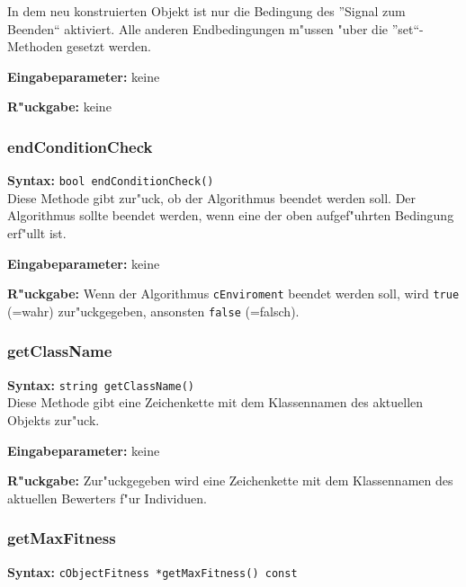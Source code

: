 In dem neu konstruierten Objekt ist nur die Bedingung des ''Signal zum Beenden`` aktiviert. Alle anderen Endbedingungen m"ussen "uber die ''set``-Methoden gesetzt werden.

\bigskip\noindent
\textbf{Eingabeparameter:} keine

\bigskip\noindent
\textbf{R"uckgabe:} keine


\subsubsection{endConditionCheck}

\textbf{Syntax:} \verb|bool endConditionCheck()| \\

Diese Methode gibt zur"uck, ob der Algorithmus beendet werden soll. Der Algorithmus sollte beendet werden, wenn eine der oben aufgef"uhrten Bedingung erf"ullt ist.

\bigskip\noindent
\textbf{Eingabeparameter:} keine

\bigskip\noindent
\textbf{R"uckgabe:} Wenn der Algorithmus \verb|cEnviroment| beendet werden soll, wird \verb|true| (=wahr) zur"uckgegeben, ansonsten \verb|false| (=falsch).


\subsubsection{getClassName}

\textbf{Syntax:} \verb|string getClassName()| \\

Diese Methode gibt eine Zeichenkette mit dem Klassennamen des aktuellen Objekts zur"uck.

\bigskip\noindent
\textbf{Eingabeparameter:} keine

\bigskip\noindent
\textbf{R"uckgabe:} Zur"uckgegeben wird eine Zeichenkette mit dem Klassennamen des aktuellen Bewerters f"ur Individuen.


\subsubsection{getMaxFitness}

\textbf{Syntax:} \verb|cObjectFitness *getMaxFitness() const| \\

